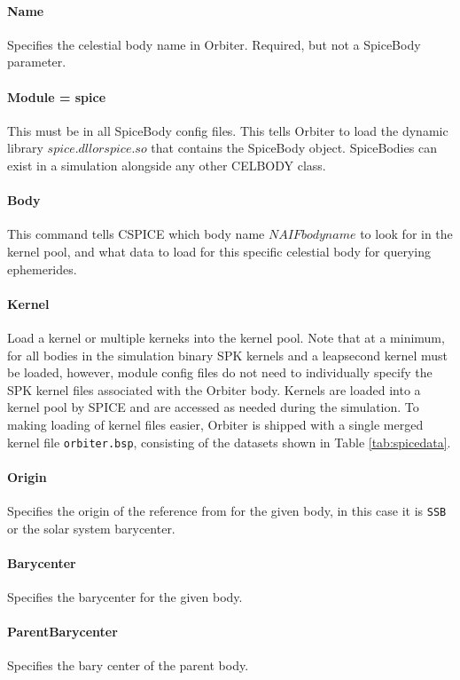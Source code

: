 \documentclass[Orbiter Technical Reference.tex]{subfiles}
\begin{document}
\paragraph{Name}
Specifies the celestial body name in Orbiter. Required, but not a SpiceBody parameter.

\paragraph{Module = spice}
This must be in all SpiceBody config files. This tells Orbiter to load the dynamic library \(spice.dll or spice.so\) that contains the SpiceBody object. SpiceBodies can exist in a simulation alongside any other CELBODY class.

\paragraph{Body}
This command tells CSPICE which body name \(NAIF body name\) to look for in the kernel pool, and what data to load for this specific celestial body for querying ephemerides.

\paragraph{Kernel}
Load a kernel or multiple kerneks into the kernel pool. Note that at a minimum, for all bodies in the simulation binary SPK kernels and a leapsecond kernel must be loaded,
however, module config files do not need to individually specify the SPK kernel files associated with the Orbiter body. Kernels are loaded into a kernel pool by SPICE and are accessed as needed during the simulation.
To making loading of kernel files easier, Orbiter is shipped with a single merged kernel file \texttt{orbiter.bsp}, consisting of the datasets shown in Table \ref{tab:spicedata}.

\paragraph{Origin}
Specifies the origin of the reference from for the given body, in this case it is \texttt{SSB} or the solar system barycenter.

\paragraph{Barycenter}
Specifies the barycenter for the given body.

\paragraph{ParentBarycenter}
Specifies the bary center of the parent body.
\end{document}
